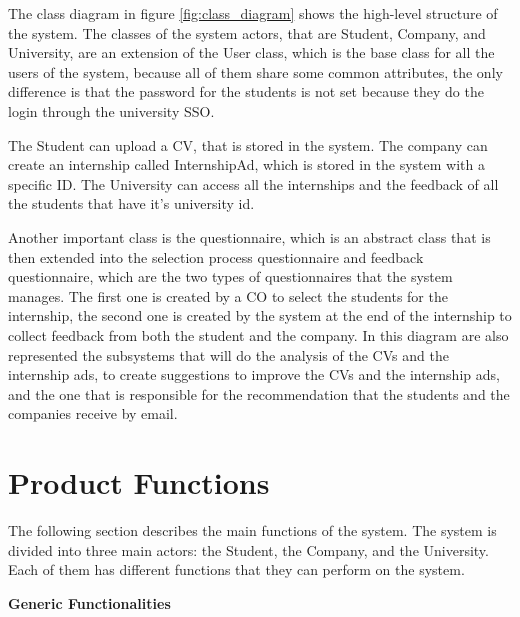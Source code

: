 \par The class diagram in figure \ref{fig:class_diagram} shows the high-level structure of the system. The classes of
the system actors, that are Student, Company, and University, are an extension of the User class, which is the base
class for all the users of the system, because all of them share some common attributes, the only difference is that
the password for the students is not set because they do the login through the university SSO.

\par The Student can upload a CV, that is stored in the system. The company can create an internship called
InternshipAd, which is stored in the system with a specific ID. The University can access all the internships and the
feedback of all the students that have it's university id.

\par Another important class is the questionnaire, which is an abstract class that is then extended into the selection
process questionnaire and feedback questionnaire, which are the two types of questionnaires that the system manages.
The first one is created by a CO to select the students for the internship, the second one is created by the system at
the end of the internship to collect feedback from both the student and the company. In this diagram are also
represented the subsystems that will do the analysis of the CVs and the internship ads, to create suggestions to
improve the CVs and the internship ads, and the one that is responsible for the recommendation that the students and
the companies receive by email.

\section{Product Functions}
\label{sec:product_functions}%

\par The following section describes the main functions of the system. The system is divided into three main actors:
the Student, the Company, and the University. Each of them has different functions that they can perform on the system.

\par\textbf{Generic Functionalities}

